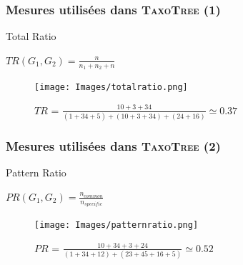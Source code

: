 \documentclass{beamer}
\begin{document}
\begin{frame}
\frametitle{Mesures utilisées dans \textsc{\bf TaxoTree} (1)}

\begin{block}{Total Ratio}
\begin{center}
$TR(G_{1},G_{2}) = \frac{n}{n_{1} + n_{2} + n}$
\end{center}
\end{block}


\begin{figure}
\centering
\texttt{[image: Images/totalratio.png]}
\caption{$TR$ = $\frac{10 + 3 + 34}{(1 + 34 + 5) + (10 + 3 + 34) + (24 + 16)} \simeq 0.37$}
\end{figure}

\end{frame}

\begin{frame}
\frametitle{Mesures utilisées dans \textsc{\bf TaxoTree} (2)}

\begin{block}{Pattern Ratio}
\begin{center}
$PR(G_{1},G_{2}) = \frac{n_{common}}{n_{specific}}$
\end{center}
\end{block}



\begin{figure}
\centering
\texttt{[image: Images/patternratio.png]}
\caption{$PR$ = $\frac{10 + 34 + 3 + 24}{(1 + 34 + 12) + (23 + 45 + 16 + 5)} \simeq 0.52$}
\end{figure}


\end{frame}
\end{document}

